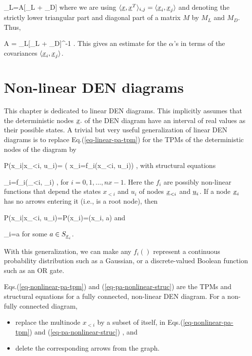 \beq
{}_L=A[_L + 
_D]
\eeq
where
we are
using 
$\langle{\underline{x}}, {\underline{x}}^T\rangle_{i, j}=
\langle{\underline{x}}_i, {\underline{x}}_j\rangle$
and denoting
the strictly lower triangular part
and diagonal part
of a matrix $M$ by $M_L$  
and $M_D$. Thus,

\beq
A = _L[_L
+ _D]^{-1}
\;.
\eeq
This gives an estimate
for the $\alpha$'s
in terms of the
 covariances $\langle{\underline{x}}_i, {\underline{x}}_j\rangle$.

\section*{Non-linear DEN diagrams}
This chapter 
is dedicated to
linear DEN diagrams. This
implicitly
assumes that 
the deterministic
nodes ${\underline{x}}.$
of the 
DEN diagram have
an interval of
real values as their
possible states.
A trivial
but very useful
generalization
of linear DEN diagrams is to
replace Eq.(\ref{eq-linear-pa-tpm})
for the TPMs
of the
deterministic nodes
of the diagram by

\beq\color{blue}
P(x_i|x_{<i}, u_i)=
\indi(
x_i=f_i(x_{<i}, u_i))
\;,
\label{eq-nonlinear-pa-tpm}
\eeq
with structural equations

\beq
\rvx_i=f_i(\rvx_{<i}, \rvu_i)
\;,
\label{eq-pa-nonlinear-struc}
\eeq
for $i=0, 1, \ldots, nx-1$.
Here the $f_i$ are 
possibly non-linear
functions
that depend
the states
$x_{<i}$ and $u_i$
of nodes ${\underline{x}}_{<i}$
and ${\underline{u}}_i$.
If a node ${\underline{x}}_i$
has no arrows
entering it (i.e., is
a root node), then

\beq\color{blue}
P(x_i|x_{<i}, u_i)=P(x_i)=\delta(x_i, a)
\eeq
and

\beq
\rvx_i=a
\eeq
for some $a\in S_{{\underline{x}}_i}$.


With this generalization,
we can make any
$f_i()$
represent a
continuous probability
distribution
such as a Gaussian,
or a discrete-valued Boolean
function
such as an OR gate.


Eqs.(\ref{eq-nonlinear-pa-tpm})
and (\ref{eq-pa-nonlinear-struc})
are the TPMs and
structural equations
for a 
fully connected, non-linear DEN diagram.
For a non-fully connected 
diagram, 
\begin{itemize}
\item
replace the multinode $x_{<i}$
by a subset of itself,
in 
Eqs.(\ref{eq-nonlinear-pa-tpm})
and (\ref{eq-pa-nonlinear-struc})
,
and
\item
delete
the corresponding arrows
from the graph.
\end{itemize}

